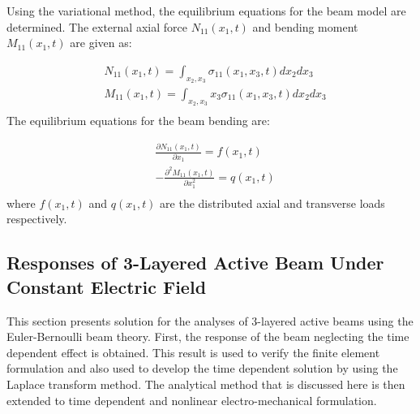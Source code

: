 Using the variational method, the equilibrium equations for the beam model are determined.
The external axial force $N_{11} (x_1,t)$ and bending moment  $M_{11} (x_1,t)$ are given as:

\begin{equation}
\begin{aligned}
& N_{11} (x_1,t)=\int_{x_2,x_3}\sigma_{11} (x_1,x_3,t)dx_2 dx_3 \\
& M_{11} (x_1,t)=\int_{x_2,x_3}x_3 \sigma_{11} (x_1,x_3,t)dx_2 dx_3 \\
\end{aligned}
\label{resultant_strain_beam:EQN}
\end{equation}
The equilibrium equations for the beam bending are:

\begin{equation}
\begin{aligned}
& \frac{\partial N_{11} (x_1,t)}{\partial x_1}=f(x_1,t) \\
& -\frac{\partial^2 M_{11} (x_1,t)}{ \partial x^2_1}=q(x_1,t)\\
\end{aligned}
\label{equilibrium_resultant_strain_beam:EQN}
\end{equation}
where
$f(x_1,t)$ and $q(x_1,t)$  are  the
distributed axial and transverse loads respectively.

\subsection{Responses of 3-Layered Active Beam Under Constant Electric Field}
\label{section:piezo_beam_static_elastic_solution}
This section presents solution for the analyses of 3-layered active beams using the Euler-Bernoulli beam theory.
First, the response of the beam neglecting the time dependent effect is obtained.
This result is used to verify the finite element formulation and also used to develop the time dependent solution by using the Laplace transform method.
The analytical method that is discussed here is then extended to time dependent and nonlinear electro-mechanical formulation.


